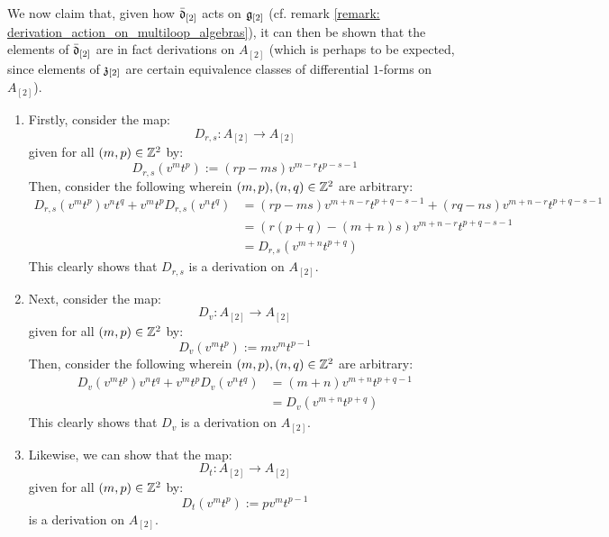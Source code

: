 \begin{remark}
                We now claim that, given how $\bar{\mathfrak{d}}_{[2]}$ acts on $\mathfrak{g}_{[2]}$ (cf. remark \ref{remark: derivation_action_on_multiloop_algebras}), it can then be shown that the elements of $\bar{\mathfrak{d}}_{[2]}$ are in fact derivations on $A_{[2]}$ (which is perhaps to be expected, since elements of $\mathfrak{z}_{[2]}$ are certain equivalence classes of differential $1$-forms on $A_{[2]}$).
                \begin{enumerate}
                    \item Firstly, consider the map:
                        $$D_{r, s}: A_{[2]} \to A_{[2]}$$
                    given for all $(m, p) \in \mathbb{Z}^2$ by:
                        $$D_{r, s}(v^m t^p) := ( rp - ms ) v^{m - r} t^{p - s - 1}$$
                    Then, consider the following wherein $(m, p), (n, q) \in \mathbb{Z}^2$ are arbitrary:
                        $$
                            \begin{aligned}
                                D_{r, s}(v^m t^p) v^n t^q + v^m t^p D_{r, s}(v^n t^q) & = ( rp - ms ) v^{m + n - r} t^{p + q - s - 1} + ( rq - ns ) v^{m + n - r} t^{p + q - s - 1}
                                \\
                                & = ( r(p + q) - (m + n)s ) v^{m + n - r} t^{p + q - s - 1}
                                \\
                                & = D_{r, s}( v^{m + n} t^{p + q} )
                            \end{aligned}
                        $$
                    This clearly shows that $D_{r, s}$ is a derivation on $A_{[2]}$.
                    \item Next, consider the map:
                        $$D_v: A_{[2]} \to A_{[2]}$$
                    given for all $(m, p) \in \mathbb{Z}^2$ by:
                        $$D_v(v^m t^p) := m v^m t^{p - 1}$$
                    Then, consider the following wherein $(m, p), (n, q) \in \mathbb{Z}^2$ are arbitrary:
                        $$
                            \begin{aligned}
                                D_v(v^m t^p) v^n t^q + v^m t^p D_v(v^n t^q) & = (m + n) v^{m + n} t^{p + q - 1}
                                \\
                                & = D_v( v^{m + n} t^{p + q} )
                            \end{aligned}
                        $$
                    This clearly shows that $D_v$ is a derivation on $A_{[2]}$.
                    \item Likewise, we can show that the map:
                        $$D_t: A_{[2]} \to A_{[2]}$$
                    given for all $(m, p) \in \mathbb{Z}^2$ by:
                        $$D_t(v^m t^p) := p v^m t^{p - 1}$$
                    is a derivation on $A_{[2]}$.
                \end{enumerate}


\end{remark}
